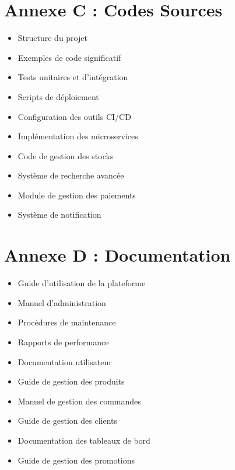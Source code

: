 \section{Annexe C : Codes Sources}
\begin{itemize}
    \item Structure du projet
    \item Exemples de code significatif
    \item Tests unitaires et d'intégration
    \item Scripts de déploiement
    \item Configuration des outils CI/CD
    \item Implémentation des microservices
    \item Code de gestion des stocks
    \item Système de recherche avancée
    \item Module de gestion des paiements
    \item Système de notification
\end{itemize}

\section{Annexe D : Documentation}
\begin{itemize}
    \item Guide d'utilisation de la plateforme
    \item Manuel d'administration
    \item Procédures de maintenance
    \item Rapports de performance
    \item Documentation utilisateur
    \item Guide de gestion des produits
    \item Manuel de gestion des commandes
    \item Guide de gestion des clients
    \item Documentation des tableaux de bord
    \item Guide de gestion des promotions
\end{itemize} 